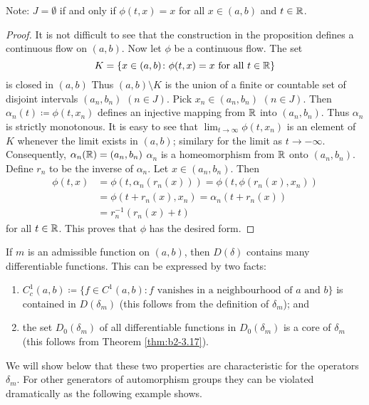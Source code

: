 Note: $J = \emptyset$ if and only if $\phi(t,x) = x$ for all $x \in (a,b)$ and $t \in \mathbb{R}$.
\begin{proof}
It is not difficult to see that the construction in the proposition defines a continuous flow on $(a,b)$.
Now let $\phi$ be a continuous flow.
The set 
\[
K = \{ x \in (a,b) \colon \phi(t,x) = x \text{ for all } t \in \mathbb{R} \} 
\]
is closed in $(a,b)$
Thus $(a,b) \setminus K$ is the union of a finite or countable set of disjoint intervals $(a_{n},b_{n})$ $(n \in J)$.
Pick $x_{n} \in (a_{n},b_{n})$ $(n \in J)$.
Then $\alpha_{n}(t) \coloneqq \phi(t,x_{n})$ defines an injective mapping from $\mathbb{R}$ into $(a_{n},b_{n})$.
Thus $\alpha_{n}$ is strictly monotonous.
It is easy to see that $\lim_{t \to \infty} \phi(t,x_{n})$ is an element of $K$ whenever the limit exists in $(a,b)$; similary for the limit as $t \to -\infty$.
Consequently, $\alpha_{n}(\mathbb{R}) = (a_{n},b_{n})$ \ie  $\alpha_{n}$ is a homeomorphism from $\mathbb{R}$ onto $(a_{n},b_{n})$.
Define $r_{n}$ to be the inverse of $\alpha_{n}$.
Let $x \in (a_{n},b_{n})$.
Then 
\begin{align*}
\phi(t,x) &= \phi(t, \alpha_{n}(r_{n}(x))) = \phi(t, \phi(r_{n}(x),x_{n})) \\
          &= \phi(t + r_{n}(x),x_{n}) = \alpha_{n}(t + r_{n}(x)) \\
          &= r_{n}^{-1}(r_{n}(x) + t)	
\end{align*}
for all $t \in \mathbb{R}$.
This proves that $\phi$ has the desired form.
\end{proof}
If $m$ is an admissible function on $(a,b)$, then $D(\delta)$ contains many differentiable functions.
This can be expressed by two facts:
\begin{enumerate}[\upshape (i)]
\item \label{enum:b2-3-1.1}
$C_{c}^{1}(a,b) \coloneqq \{ f \in C^{1}(a,b) \colon f \text{ vanishes in a neighbourhood of } a \text{ and } b\}$ is contained in $D(\delta_{m})$ (this follows from the definition of $\delta_{m}$); and
\item  \label{enum:b2-3-1.2}
the set $D_{0}(\delta_{m})$ of all differentiable functions in $D_{0}(\delta_{m})$ is a core of $\delta_{m}$ (this follows from Theorem \ref{thm:b2-3.17}).
\end{enumerate}
We will show below that these two properties are characteristic for the operators $\delta_{m}$.
For other generators of automorphism groups they can be violated dramatically as the following example shows.
